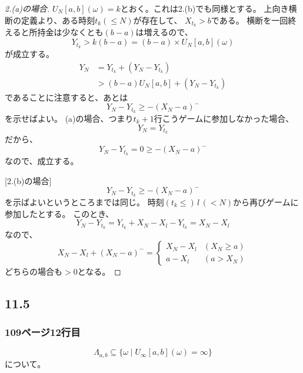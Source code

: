 \begin{proof}
        [2.(a)の場合]
        $U_N[a,b](\omega) = k$とおく。これは2.(b)でも同様とする。
        上向き横断の定義より、ある時刻$t_k (\leq N)$が存在して、
        $X_{t_k} > b$である。
        横断を一回終えると所持金は少なくとも$(b-a)$は増えるので、
        \[Y_{t_k} > k(b-a) = (b-a) \times U_N[a,b](\omega)\]
        が成立する。
        \begin{align*}
          Y_N &= Y_{t_k} + (Y_N - Y_{t_k}) \\
          &> (b - a)U_N[a,b] + (Y_N - Y_{t_k})
        \end{align*}
        であることに注意すると、あとは
        \[Y_N - Y_{t_k} \ge -(X_N - a)^-\]
        を示せばよい。
        (a)の場合、つまり$t_k + 1$行こうゲームに参加しなかった場合、
        \[Y_N = Y_{t_k}\]
        だから、
        \[Y_N - Y_{t_k} = 0 \ge -(X_N - a)^-\]
        なので、成立する。

        [2.(b)の場合]
        \[Y_N - Y_{t_k} \ge -(X_N - a)^-\]
        を示ばよいというところまでは同じ。
        時刻$(t_k \leq)\, l \,(< N)$から再びゲームに参加したとする。
        このとき、
        \[
          Y_N - Y_{t_k} = Y_{t_k} + X_N - X_l - Y_{t_k} = X_N - X_l
        \]
        なので、
        \begin{equation*}
          X_N - X_l + (X_N - a)^- = \begin{cases}
            X_N - X_l & (X_N \ge a)\\
            a -X_l & (a> X_N)
        \end{cases}
        \end{equation*}
        どちらの場合も$>0$となる。
      \end{proof}

  \subsection{11.5}
    \subsubsection{109ページ12行目}
      \[
        \Lambda_{a,b} \subseteq \{\omega \mid U_{\infty}[a,b](\omega) = \infty\}
      \]
      について。

